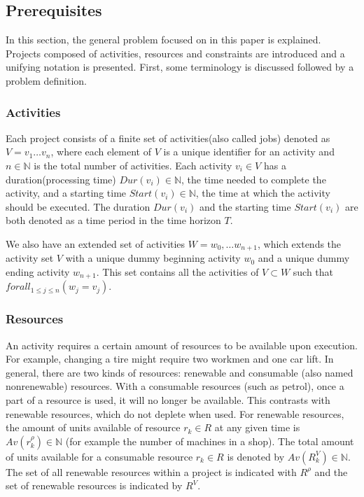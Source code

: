 \documentclass{article}
\begin{document}
\subsection{Prerequisites}
In this section, the general problem focused on in this paper is explained.
Projects composed of activities, resources and constraints are introduced and a unifying notation is presented.
First, some terminology is discussed followed by a problem definition.

\subsubsection{Activities}
Each project consists of a finite set of activities(also called jobs) denoted as $V = v_1 \ldots v_n$, where each element of $V$ is a unique identifier for an activity and $n \in \mathbb{N}$ is the total number of activities.
Each activity $v_i \in V$ has a duration(processing time) $Dur(v_i) \in \mathbb{N}$, the time needed to complete the activity, and a starting time $Start(v_i) \in \mathbb{N}$, the time at which the activity should be executed. The duration $Dur(v_i)$ and the starting time $Start(v_i)$ are both denoted as a time period in the time horizon $T$.

We also have an extended set of activities $W = w_0, \ldots w_{n+1}$, which extends the activity set $V$ with a unique dummy beginning activity $w_0$ and a unique dummy ending activity $w_{n+1}$. This set contains all the activities of $V \subset W$ such that $forall_{1 \leq j \leq n}(w_j = v_j)$.

\subsubsection{Resources}
An activity requires a certain amount of resources to be available upon execution.
For example, changing a tire might require two workmen and one car lift.
In general, there are two kinds of resources: renewable and consumable (also named nonrenewable) resources.
With a consumable resources (such as petrol), once a part of a resource is used, it will no longer be available.
This contrasts with renewable resources, which do not deplete when used.
For renewable resources, the amount of units available of resource $r_k \in R$ at any given time is $Av(r^{\rho}_k) \in \mathbb{N}$ (for example the number of machines in a shop).
The total amount of units available for a consumable resource $r_k \in R$ is denoted by $Av(R^{V}_k) \in \mathbb{N}$.
The set of all renewable resources within a project is indicated with $R^{\rho}$ and the set of renewable resources is indicated by $R^{V}$. 
\end{document}
